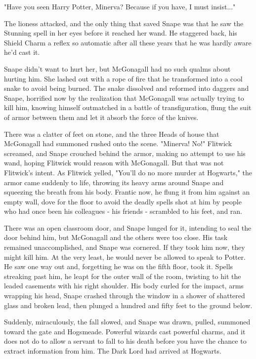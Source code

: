 \documentclass[a4paper,11pt]{article}
\begin{document}
"Have you seen Harry Potter, Minerva? Because if you have, I must insist..."

The lioness attacked, and the only thing that saved Snape was that he saw the Stunning spell in her eyes before it reached her wand. He staggered back, his Shield Charm a reflex so automatic after all these years that he was hardly aware he'd cast it.

Snape didn't want to hurt her, but McGonagall had no such qualms about hurting him. She lashed out with a rope of fire that he transformed into a cool snake to avoid being burned. The snake dissolved and reformed into daggers and Snape, horrified now by the realization that McGonagall was actually trying to kill him, knowing himself outmatched in a battle of transfiguration, flung the suit of armor between them and let it absorb the force of the knives.

There was a clatter of feet on stone, and the three Heads of house that McGonagall had summoned rushed onto the scene. "Minerva! No!" Flitwick screamed, and Snape crouched behind the armor, making no attempt to use his wand, hoping Flitwick would reason with McGonagall. But that was not Flitwick's intent. As Flitwick yelled, "You'll do no more murder at Hogwarts," the armor came suddenly to life, throwing its heavy arms around Snape and squeezing the breath from his body. Frantic now, he flung it from him against an empty wall, dove for the floor to avoid the deadly spells shot at him by people who had once been his colleagues - his friends - scrambled to his feet, and ran.

There was an open classroom door, and Snape lunged for it, intending to seal the door behind him, but McGonagall and the others were too close. His task remained unaccomplished, and Snape was cornered. If they took him now, they might kill him. At the very least, he would never be allowed to speak to Potter. He saw one way out and, forgetting he was on the fifth floor, took it. Spells streaking past him, he leapt for the outer wall of the room, twisting to hit the leaded casements with his right shoulder. His body curled for the impact, arms wrapping his head, Snape crashed through the window in a shower of shattered glass and broken lead, then plunged a hundred and fifty feet to the ground below.

Suddenly, miraculously, the fall slowed, and Snape was drawn, pulled, summoned toward the gate and Hogsmeade. Powerful wizards cast powerful charms, and it does not do to allow a servant to fall to his death before you have the chance to extract information from him. The Dark Lord had arrived at Hogwarts.
\end{document}
